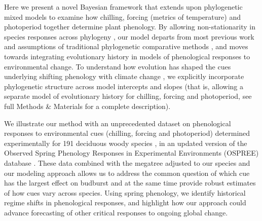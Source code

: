 \documentclass[11pt]{article}
\begin{document}
Here we present a novel Bayesian framework that extends upon phylogenetic mixed models \citep{housworth2004phylogenetic} to examine how chilling, forcing (metrics of temperature) and photoperiod together determine plant phenology. By allowing non-stationarity in species responses across phylogeny \citep{davies2019phylogenetically}, our model departs from most previous work and assumptions of traditional phylogenetic comparative methods \citep[e.g.][]{freckleton2002phylogenetic,ives2011generalized,hadfield2010mcmc}, and moves towards integrating evolutionary history in models of phenological responses to environmental change. To understand how evolution has shaped the cues underlying shifting phenology with climate change \citep{uyeda2017evolution}, we explicitly incorporate phylogenetic structure across model intercepts and slopes (that is, allowing a separate model of evolutionary history for chilling, forcing and photoperiod, see full Methods \& Materials for a complete description). 

We illustrate our method with an unprecedented dataset on phenological responses to environmental cues (chilling, forcing and photoperiod) determined experimentally for 191 deciduous woody species \cite[by far the most studied group of species in phenology experiments, see][]{ettinger2020}, in an updated version of the Observed Spring Phenology Responses in Experimental Environments (OSPREE) database \citep{wolkovich2019}. These data combined with the \citet{smith2018constructing} megatree adjusted to our species and our modeling approach allows us to address the common question of which cue has the largest effect on budburst and at the same time provide robust estimates of how cues vary across species. Using spring phenology, we identify historical regime shifts \citep{uyeda2017evolution} in phenological responses, and highlight how our approach could advance forecasting of other critical responses to ongoing global change.



\end{document}
